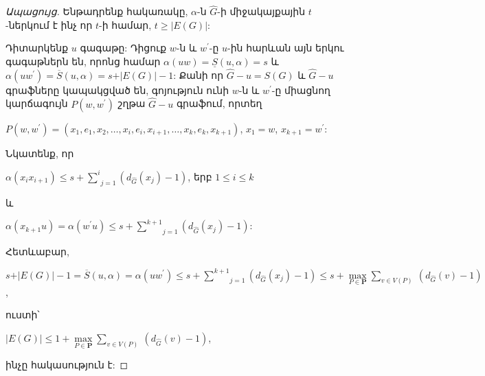 \begin{proof}[Ապացույց]
Ենթադրենք հակառակը, $\alpha$-ն $\widehat{G}$-ի միջակայքային 
$t$-ներկում է ինչ որ $t$-ի համար, $t\geq \vert E(G)\vert$:

Դիտարկենք $u$ գագաթը: Դիցուք $w$-ն և $w^{\prime}$-ը $u$-ին հարևան այն երկու գագաթներն են, որոնց համար $\alpha(uw)=\underline{S}(u,\alpha)=s$ և
$\alpha(uw^{\prime})=\overline{S}(u,\alpha)=s+\vert E(G)\vert-1$: Քանի որ $\widehat{G}-u=S(G)$ և $\widehat{G}-u$ գրաֆները կապակցված են, գոյություն ունի $w$-ն և $w^{\prime}$-ը միացնող կարճագույն $P(w,w^{\prime})$ շղթա $\widehat{G}-u$ գրաֆում, որտեղ
\begin{center}
$P(w,w^{\prime})=(x_{1},e_{1},x_{2},\ldots,x_{i},e_{i},x_{i+1},\ldots,x_{k},e_{k},x_{k+1})$,
$x_{1}=w$, $x_{k+1}=w^{\prime}$:
\end{center}

Նկատենք, որ
\begin{center}
$\alpha(x_{i}x_{i+1})\leq s+\underset{j=1}{\overset{i}{\sum
}}(d_{\widehat{G}}(x_{j})-1)$, երբ $1\leq i\leq k$
\end{center}
և
\begin{center}
$\alpha(x_{k+1}u)=\alpha(w^{\prime}u)\leq
s+\underset{j=1}{\overset{k+1}{\sum }}(d_{\widehat{G}}(x_{j})-1)$:
\end{center}

Հետևաբար,
\begin{center}
$s+\vert E(G)\vert -1=\overline{S}(u,\alpha)=\alpha(uw^{\prime})\leq
s+\underset{j=1}{\overset{k+1}{\sum }}(d_{\widehat{G}}(x_{j})-1)\leq
s+{\max\limits_{P\in \mathbf{P}}}{\sum\limits_{v\in V(P)}}\
\left(d_{\widehat{G}}(v)-1\right)$,
\end{center}
ուստի՝
\begin{center}
$\vert E(G)\vert \leq 1+{\max\limits_{P\in
\mathbf{P}}}{\sum\limits_{v\in V(P)}}\
\left(d_{\widehat{G}}(v)-1\right)$,
\end{center}
ինչը հակասություն է:
\end{proof}

